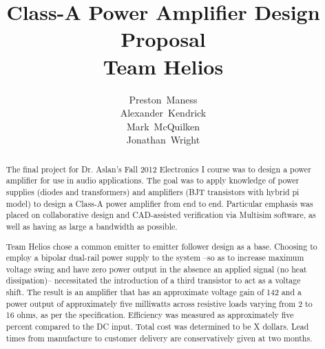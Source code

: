 \documentclass[journal]{IEEEtran}
\begin{document}
\title{Class-A Power Amplifier Design Proposal\\Team Helios}
\author{Preston~Maness\\Alexander~Kendrick\\Mark~McQuilken\\Jonathan~Wright}

%
{}

\maketitle

\begin{abstract}
The final project for Dr. Aslan's Fall 2012 Electronics I course was to design a power amplifier for use in audio applications. The goal was to apply knowledge of power supplies (diodes and transformers) and amplifiers (BJT transistors with hybrid pi model) to design a Class-A power amplifier from end to end. Particular emphasis was placed on collaborative design and CAD-assisted verification via Multisim software, as well as having as large a bandwidth as possible. 

Team Helios chose a common emitter to emitter follower design as a base. Choosing to employ a bipolar dual-rail power supply to the system --so as to increase maximum voltage swing and have zero power output in the absence an applied signal (no heat dissipation)-- necessitated the introduction of a third transistor to act as a voltage shift. The result is an amplifier that has an approximate voltage gain of 142 and a power output of approximately five milliwatts across resistive loads varying from 2 to 16 ohms, as per the specification. Efficiency was measured as approximately five percent compared to the DC input. Total cost was determined to be X dollars. Lead times from manufacture to customer delivery are conservatively given at two months.
\end{abstract}

\tableofcontents

\newpage

\end{document}
